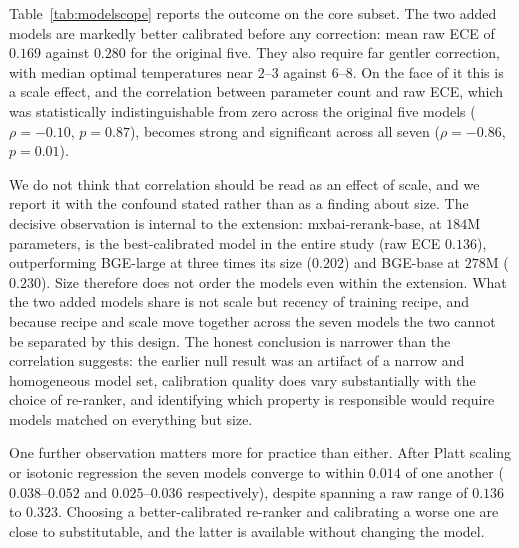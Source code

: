 \documentclass[sn-mathphys-num,pdflatex]{sn-jnl}
\begin{document}
Table~\ref{tab:modelscope} reports the outcome on the core subset. The two added
models are markedly better calibrated before any correction: mean raw ECE of $0.169$
against $0.280$ for the original five. They also require far gentler correction,
with median optimal temperatures near $2$--$3$ against $6$--$8$. On the face of it
this is a scale effect, and the correlation between parameter count and raw ECE,
which was statistically indistinguishable from zero across the original five models
($\rho = -0.10$, $p = 0.87$), becomes strong and significant across all seven
($\rho = -0.86$, $p = 0.01$).

We do not think that correlation should be read as an effect of scale, and we report
it with the confound stated rather than as a finding about size. The decisive
observation is internal to the extension: mxbai-rerank-base, at $184$M parameters,
is the best-calibrated model in the entire study (raw ECE $0.136$), outperforming
BGE-large at three times its size ($0.202$) and BGE-base at $278$M ($0.230$). Size
therefore does not order the models even within the extension. What the two added
models share is not scale but recency of training recipe, and because recipe and
scale move together across the seven models the two cannot be separated by this
design. The honest conclusion is narrower than the correlation suggests: the earlier
null result was an artifact of a narrow and homogeneous model set, calibration
quality does vary substantially with the choice of re-ranker, and identifying which
property is responsible would require models matched on everything but size.

One further observation matters more for practice than either. After Platt scaling
or isotonic regression the seven models converge to within $0.014$ of one another
($0.038$--$0.052$ and $0.025$--$0.036$ respectively), despite spanning a raw range of
$0.136$ to $0.323$. Choosing a better-calibrated re-ranker and calibrating a worse
one are close to substitutable, and the latter is available without changing the
model.
\end{document}
